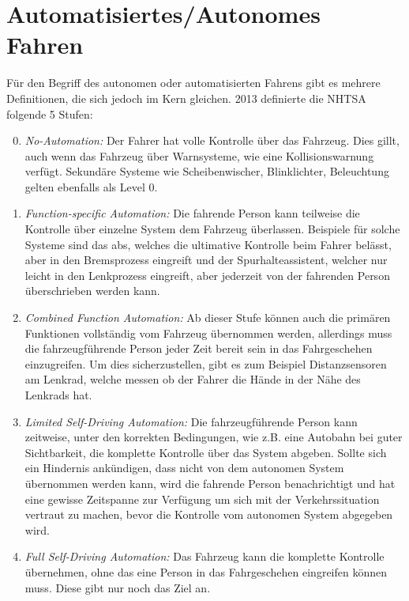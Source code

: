 \documentclass[conference,compsoc,final,a4paper]{IEEEtran}
\begin{document}
\section{Automatisiertes/Autonomes Fahren}


Für den Begriff des autonomen oder automatisierten Fahrens gibt es mehrere Definitionen, die sich jedoch im Kern gleichen.
2013 definierte die \ac{NHTSA} folgende 5 Stufen\cite{NHTSA2013}:
\begin{enumerate}
  \setcounter{enumi}{-1}
  \item \emph{No-Automation:} Der Fahrer hat volle Kontrolle über das Fahrzeug. Dies gillt, auch wenn das Fahrzeug über Warnsysteme, wie eine Kollisionswarnung verfügt. Sekundäre Systeme wie Scheibenwischer, Blinklichter, Beleuchtung gelten ebenfalls als Level 0.
  \item \emph{Function-specific Automation:} Die fahrende Person kann teilweise die Kontrolle über einzelne System dem Fahrzeug überlassen. Beispiele für solche Systeme sind das \ac{abs}, welches die ultimative Kontrolle beim Fahrer belässt, aber in den Bremsprozess eingreift und der Spurhalteassistent, welcher nur leicht in den Lenkprozess eingreift, aber jederzeit von der fahrenden Person überschrieben werden kann.
  \item \emph{Combined Function Automation:} Ab dieser Stufe können auch die primären Funktionen vollständig vom Fahrzeug übernommen werden, allerdings muss die fahrzeugführende Person jeder Zeit bereit sein in das Fahrgeschehen einzugreifen. Um dies sicherzustellen, gibt es zum Beispiel Distanzsensoren am Lenkrad, welche messen ob der Fahrer die Hände in der Nähe des Lenkrads hat. %
  \item \emph{Limited Self-Driving Automation:} Die fahrzeugführende Person kann zeitweise, unter den korrekten Bedingungen, wie z.B. eine Autobahn bei guter Sichtbarkeit, die komplette Kontrolle über das System abgeben. Sollte sich ein Hindernis ankündigen, dass nicht von dem autonomen System übernommen werden kann, wird die fahrende Person benachrichtigt und hat eine gewisse Zeitspanne zur Verfügung um sich mit der Verkehrssituation vertraut zu machen, bevor die Kontrolle vom autonomen System abgegeben wird.
  \item \emph{Full Self-Driving Automation:} Das Fahrzeug kann die komplette Kontrolle übernehmen, ohne das eine Person in das Fahrgeschehen eingreifen können muss. Diese gibt nur noch das Ziel an.
\end{enumerate}
\end{document}
